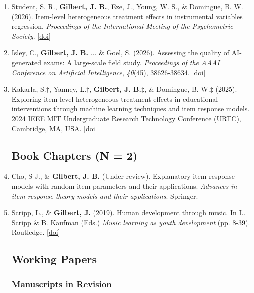 \documentclass[11pt]{article}
\begin{document}
\begin{enumerate}
\item Student, S. R., \textbf{Gilbert, J. B.}, Eze, J., Young, W. S., \& Domingue, B. W. (2026). Item-level heterogeneous treatment effects in instrumental variables regression. \textit{Proceedings of the International Meeting of the Psychometric Society}. [\href{https://doi.org/10.64028/imps2025.3NE3nHCRtP}{doi}]
\item Isley, C., \textbf{Gilbert, J. B.} ... \& Goel, S. (2026). Assessing the quality of AI-generated exams: A large-scale field study. \textit{Proceedings of the AAAI Conference on Artificial Intelligence}, \textit{40}(45), 38626-38634. [\href{https://ojs.aaai.org/index.php/AAAI/article/view/41205}{doi}]
\item Kakarla, S.$\dagger$, Yanney, L.$\dagger$, \textbf{Gilbert, J. B.}$\ddagger$, \& Domingue, B. W.$\ddagger$ (2025). Exploring item-level heterogeneous treatment effects in educational interventions through machine learning techniques and item response models. 2024 IEEE MIT Undergraduate Research Technology Conference (URTC), Cambridge, MA, USA. [\href{https://ieeexplore.ieee.org/document/10937510}{doi}]

\subsection{Book Chapters (N = 2)}

    \item Cho, S-J., \& \textbf{Gilbert, J. B.} (Under review). Explanatory item response models with random item parameters and their applications. \textit{Advances in item response theory models and their applications}. Springer.
    \item Scripp, L., \& \textbf{Gilbert, J.} (2019). Human development through music. In L. Scripp \& B. Kaufman (Eds.) \textit{Music learning as youth development} (pp. 8-39). Routledge. [\href{https://www.routledge.com/Music-Learning-as-Youth-Development/Kaufman-Scripp/p/book/9781138347700#:~:text=Music%20Learning%20as%20Youth%20Development%20explores%20how%20music%20education%20programs,of%20life%2Dlong%20musical%20development.}{doi}]

\subsection{Working Papers}

\subsubsection{Manuscripts in Revision}


\end{enumerate}
\end{document}
